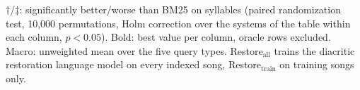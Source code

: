 \begin{table}[t]
\vspace{2pt}
\parbox{\textwidth}{\footnotesize $\dagger$/$\ddagger$: significantly better/worse than BM25 on syllables (paired randomization test, 10{,}000 permutations, Holm correction over the systems of the table within each column, $p<0.05$). Bold: best value per column, oracle rows excluded. Macro: unweighted mean over the five query types. Restore$_{\mathrm{all}}$ trains the diacritic restoration language model on every indexed song, Restore$_{\mathrm{train}}$ on training songs only.}
\end{table}
